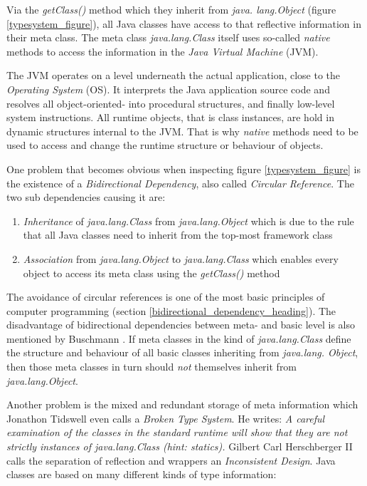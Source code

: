 Via the \emph{getClass()} method which they inherit from \emph{java. lang.Object}
(figure \ref{typesystem_figure}), all Java classes have access to that reflective
information in their meta class. The meta class \emph{java.lang.Class} itself
uses so-called \emph{native} methods to access the information in the
\emph{Java Virtual Machine} (JVM).

The JVM operates on a level underneath the actual application, close to the
\emph{Operating System} (OS). It interprets the Java application source code and
resolves all object-oriented- into procedural structures, and finally low-level
system instructions. All runtime objects, that is class instances, are hold in
dynamic structures internal to the JVM. That is why \emph{native} methods need
to be used to access and change the runtime structure or behaviour of objects.

One problem that becomes obvious when inspecting figure \ref{typesystem_figure}
is the existence of a \emph{Bidirectional Dependency}, also called
\emph{Circular Reference}. The two sub dependencies causing it are:

\begin{enumerate}
    \item \emph{Inheritance} of \emph{java.lang.Class} from \emph{java.lang.Object}
        which is due to the rule that all Java classes need to inherit from the
        top-most framework class
    \item \emph{Association} from \emph{java.lang.Object} to \emph{java.lang.Class}
        which enables every object to access its meta class using the
        \emph{getClass()} method
\end{enumerate}

The avoidance of circular references is one of the most basic principles of
computer programming (section \ref{bidirectional_dependency_heading}). The
disadvantage of bidirectional dependencies between meta- and basic level is
also mentioned by Buschmann \cite{buschmann}. If meta classes in the kind of
\emph{java.lang.Class} define the structure and behaviour of all basic classes
inheriting from \emph{java.lang. Object}, then those meta classes in turn should
\emph{not} themselves inherit from \emph{java.lang.Object}.

Another problem is the mixed and redundant storage of meta information which
Jonathon Tidswell \cite{josgeneral} even calls a \emph{Broken Type System}. He
writes: \textit{A careful examination of the classes in the standard runtime will
show that they are not strictly instances of java.lang.Class (hint: statics).}
Gilbert Carl Herschberger II \cite{josgeneral} calls the separation of
reflection and wrappers an \emph{Inconsistent Design}. Java classes are based
on many different kinds of type information:

